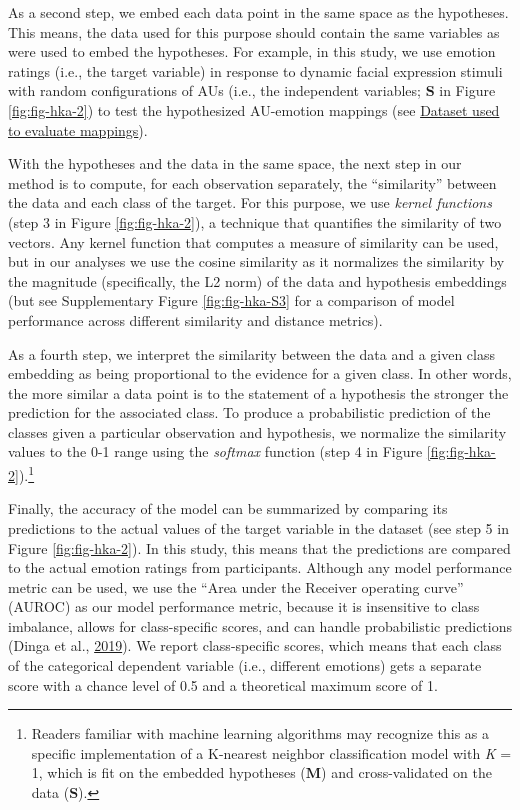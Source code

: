 \documentclass[11pt,american,a4paper,oneside,]{memoir} %
\let\rmarkdownfootnote\footnote%
\def\footnote{\protect\rmarkdownfootnote}
\begin{document}
As a second step, we embed each data point in the same space as the hypotheses. This means, the data used for this purpose should contain the same variables as were used to embed the hypotheses. For example, in this study, we use emotion ratings (i.e., the target variable) in response to dynamic facial expression stimuli with random configurations of AUs (i.e., the independent variables; \(\mathbf{S}\) in Figure \ref{fig:fig-hka-2}) to test the hypothesized AU-emotion mappings (see \protect\hyperlink{hka-dataset}{Dataset used to evaluate mappings}).

With the hypotheses and the data in the same space, the next step in our method is to compute, for each observation separately, the ``similarity'' between the data and each class of the target. For this purpose, we use \emph{kernel functions} (step 3 in Figure \ref{fig:fig-hka-2}), a technique that quantifies the similarity of two vectors. Any kernel function that computes a measure of similarity can be used, but in our analyses we use the cosine similarity as it normalizes the similarity by the magnitude (specifically, the L2 norm) of the data and hypothesis embeddings (but see Supplementary Figure \ref{fig:fig-hka-S3} for a comparison of model performance across different similarity and distance metrics).

As a fourth step, we interpret the similarity between the data and a given class embedding as being proportional to the evidence for a given class. In other words, the more similar a data point is to the statement of a hypothesis the stronger the prediction for the associated class. To produce a probabilistic prediction of the classes given a particular observation and hypothesis, we normalize the similarity values to the 0-1 range using the \emph{softmax} function (step 4 in Figure \ref{fig:fig-hka-2}).\footnote{Readers familiar with machine learning algorithms may recognize this as a specific implementation of a K-nearest neighbor classification model with \emph{K} = 1, which is fit on the embedded hypotheses (\(\mathbf{M}\)) and cross-validated on the data (\(\mathbf{S}\)).}

Finally, the accuracy of the model can be summarized by comparing its predictions to the actual values of the target variable in the dataset (see step 5 in Figure \ref{fig:fig-hka-2}). In this study, this means that the predictions are compared to the actual emotion ratings from participants. Although any model performance metric can be used, we use the ``Area under the Receiver operating curve'' (AUROC) as our model performance metric, because it is insensitive to class imbalance, allows for class-specific scores, and can handle probabilistic predictions (Dinga et al., \protect\hyperlink{ref-Dinga2019-mh}{2019}). We report class-specific scores, which means that each class of the categorical dependent variable (i.e., different emotions) gets a separate score with a chance level of 0.5 and a theoretical maximum score of 1.
\end{document}
